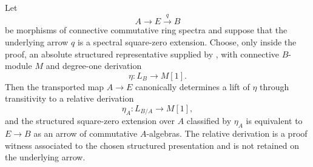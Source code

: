 \begin{lemma}
\label{lem:underlying-square-zero-relative-refinement}
Let
\[
    A\longrightarrow E\xrightarrow{q}B
\]
be morphisms of connective commutative ring spectra and suppose that the
underlying arrow \(q\) is a spectral square-zero extension. Choose, only
inside the proof, an absolute structured representative supplied by
, with connective
\(B\)-module \(M\) and degree-one derivation
\[
    \eta:L_B\longrightarrow M[1].
\]
Then the transported map \(A\to E\) canonically determines a lift of
\(\eta\) through transitivity to a relative derivation
\[
    \eta_A:L_{B/A}\longrightarrow M[1],
\]
and the structured square-zero extension over \(A\) classified by
\(\eta_A\) is equivalent to \(E\to B\) as an arrow of commutative
\(A\)-algebras. The relative derivation is a proof witness associated to the
chosen structured presentation and is not retained on the underlying arrow.
\end{lemma}

